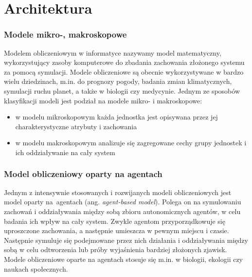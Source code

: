 \section{Architektura}

\subsubsection{Modele mikro-, makroskopowe}
Modelem obliczeniowym w informatyce nazywamy model matematyczny, wykorzystujący zasoby komputerowe do zbadania zachowania złożonego systemu za pomocą symulacji\cite{model}. Modele obliczeniowe są obecnie wykorzystywane w bardzo wielu dziedzinach, m.in. do prognozy pogody, badania zmian klimatycznych, symulacji ruchu planet, a także w biologii czy medycynie. Jednym ze sposobów klasyfikacji modeli jest podział na modele mikro- i makroskopowe\cite{micmac}:
\begin{itemize}
\item w modelu mikroskopowym każda jednostka jest opisywana przez jej charakterystyczne atrybuty i zachowania
\item w modelu makroskopowym analizuje się zagregowane cechy grupy jednostek i ich oddziaływanie na cały system
\end{itemize}
\subsubsection{Model obliczeniowy oparty na agentach}
Jednym z intensywnie stosowanych i rozwijanych modeli obliczeniowych jest model oparty na~agentach (ang. \textit{agent-based model}).
Polega on na symulowaniu zachowań i oddziaływania między sobą zbioru autonomicznych agentów, w celu badania ich wpływ na cały system\cite{agent-based}. Zwykle agentom przyporządkowuje się uproszczone zachowania, a następnie umieszcza w pewnym miejscu i czasie. Następnie symuluje się podejmowane przez nich działania i oddziaływania między sobą w celu odtworzenia lub próby wyjaśnienia bardziej złożonych zjawisk. Modele obliczeniowe oparte na agentach stosuje się m.in. w biologii, ekologii czy naukach społecznych.

